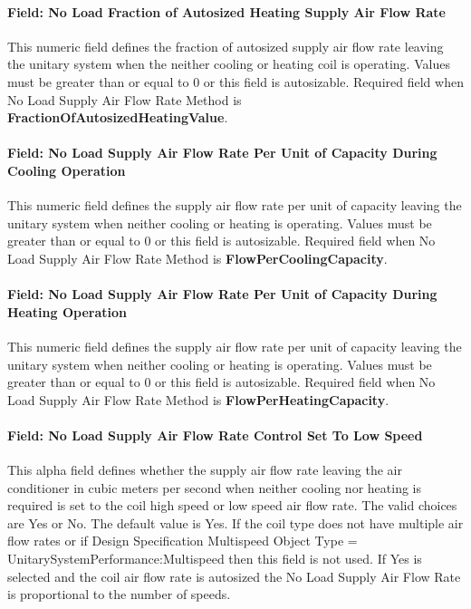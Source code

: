 \paragraph{Field: No Load Fraction of Autosized Heating Supply Air Flow Rate}\label{field-no-load-fraction-of-autosized-heating-supply-air-flow-rate}

This numeric field defines the fraction of autosized supply air flow rate leaving the unitary system when the neither cooling or heating coil is operating. Values must be greater than or equal to 0 or this field is autosizable. Required field when No Load Supply Air Flow Rate Method is \textbf{FractionOfAutosizedHeatingValue}.

\paragraph{Field: No Load Supply Air Flow Rate Per Unit of Capacity During Cooling Operation}\label{field-no-load-supply-air-flow-rate-per-unit-of-capacity-during-cooling-operation}

This numeric field defines the supply air flow rate per unit of capacity leaving the unitary system when neither cooling or heating is operating. Values must be greater than or equal to 0 or this field is autosizable. Required field when No Load Supply Air Flow Rate Method is \textbf{FlowPerCoolingCapacity}.

\paragraph{Field: No Load Supply Air Flow Rate Per Unit of Capacity During Heating Operation}\label{field-no-load-supply-air-flow-rate-per-unit-of-capacity-during-heating-operation}

This numeric field defines the supply air flow rate per unit of capacity leaving the unitary system when neither cooling or heating is operating. Values must be greater than or equal to 0 or this field is autosizable. Required field when No Load Supply Air Flow Rate Method is \textbf{FlowPerHeatingCapacity}.

\paragraph{Field: No Load Supply Air Flow Rate Control Set To Low Speed}\label{field-no-load-supply-air-flow-rate-control-set-to-low-speed-004}

This alpha field defines whether the supply air flow rate leaving the air conditioner in cubic meters per second when neither cooling nor heating is required is set to the coil high speed or low speed air flow rate. The valid choices are Yes or No. The default value is Yes. If the coil type does not have multiple air flow rates or if Design Specification Multispeed Object Type = UnitarySystemPerformance:Multispeed then this field is not used. If Yes is selected and the coil air flow rate is autosized the No Load Supply Air Flow Rate is proportional to the number of speeds.

